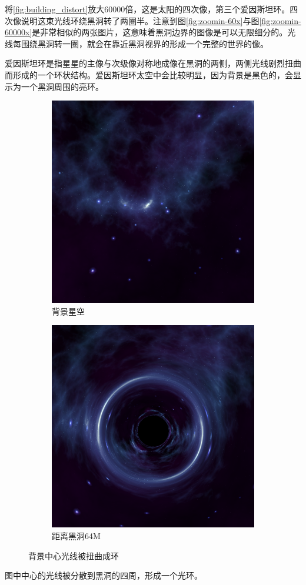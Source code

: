 将\ref{fig:building_distort}放大60000倍，这是太阳的四次像，第三个爱因斯坦环。四次像说明这束光线环绕黑洞转了两圈半。注意到图\ref{fig:zoomin-60x}与图\ref{fig:zoomin-60000x}是非常相似的两张图片，这意味着黑洞边界的图像是可以无限细分的。光线每围绕黑洞转一圈，就会在靠近黑洞视界的形成一个完整的世界的像。

爱因斯坦环是指星星的主像与次级像对称地成像在黑洞的两侧，两侧光线剧烈扭曲而形成的一个环状结构。爱因斯坦环太空中会比较明显，因为背景是黑色的，会显示为一个黑洞周围的亮环。
\begin{figure}[H]
    \centering
    \begin{subfigure}{.5\textwidth}
        \centering
        \includegraphics[width=.8\linewidth]{images/no_ring.png}
        \caption{背景星空}
        \label{fig:no-ring}
    \end{subfigure}%
    \begin{subfigure}{.5\textwidth}
        \centering
        \includegraphics[width=.8\linewidth]{images/einstein_ring.png}
        \caption{距离黑洞64M}
        \label{fig:einstein-ring}
    \end{subfigure}
    \caption{背景中心光线被扭曲成环}
\end{figure}
图中中心的光线被分散到黑洞的四周，形成一个光环。

